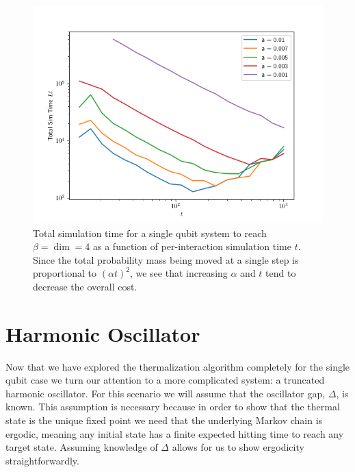 \documentclass{article}
\begin{document}

\begin{figure} 
    \centering
    \includegraphics[width=0.75\linewidth]{numerics/data/total_time_vs_time.png}
    \caption{Total simulation time for a single qubit system to reach $\beta = \dim = 4$ as a function of per-interaction simulation time $t$. Since the total probability mass being moved at a single step is proportional to $(\alpha t)^2$, we see that increasing $\alpha$ and $t$ tend to decrease the overall cost.}\label{fig:tot_time_vs_single_time}
\end{figure}

\section{Harmonic Oscillator}
Now that we have explored the thermalization algorithm completely for the single qubit case we turn our attention to a more complicated system: a truncated harmonic oscillator. For this scenario we will assume that the oscillator gap, $\Delta$, is known. This assumption is necessary because in order to show that the thermal state is the unique fixed point we need that the underlying Markov chain is ergodic, meaning any initial state has a finite expected hitting time to reach any target state. Assuming knowledge of $\Delta$ allows for us to show ergodicity straightforwardly.
\end{document}
